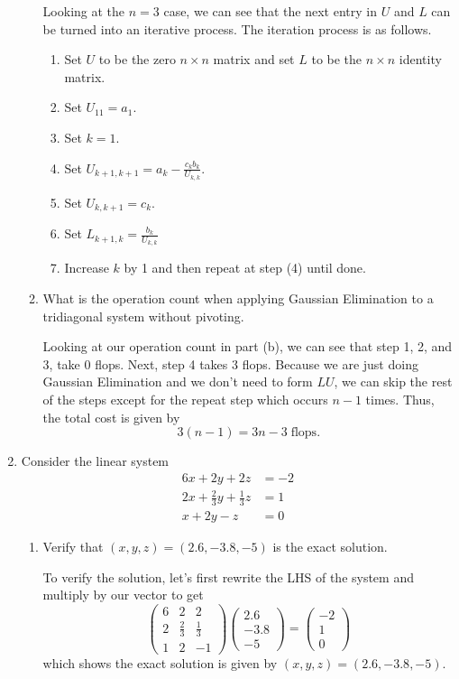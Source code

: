 \documentclass[a4paper,12pt]{article}
\newcommand{\pmat}[1]{\begin{pmatrix} #1 \end{pmatrix}}
\begin{document}
\begin{enumerate}[label = \arabic*.]
\begin{enumerate}[label = (\alph*)]
		Looking at the $ n = 3 $ case, we can see that the next entry in $ U $ and $ L $ can be turned into an iterative process. The iteration process is as follows. 
		\begin{enumerate}[label = (\arabic*)]
			\item Set $ U $ to be the zero $ n \times n $ matrix and set $ L $ to be the $ n \times n $ identity matrix.
			\item Set $ U_{11} = a_1$.
			\item Set $ k = 1 $.
			\item Set $ U_{k+1, k+1} = a_k - \frac{c_k b_k}{U_{k,k}} $.
			\item Set $ U_{k, k+1} = c_k $.
			\item Set $ L_{k+1, k} = \frac{b_k}{U_{k,k}} $
			\item Increase $ k $ by 1 and then repeat at step (4) until done.
		\end{enumerate}
	
		\item What is the operation count when applying Gaussian Elimination to a tridiagonal system without pivoting.
		
		Looking at our operation count in part (b), we can see that step 1, 2, and 3, take 0 flops. Next, step 4 takes 3 flops. Because we are just doing Gaussian Elimination and we don't need to form $ LU $, we can skip the rest of the steps except for the repeat step which occurs $ n - 1 $ times. Thus, the total cost is given by 
		\[
			3 (n - 1) = 3n - 3 \; \text{flops}.
		\]
	\end{enumerate}

	\item Consider the linear system
	\begin{align*}
		6x + 2y + 2z &= -2 \\
		2x + \frac{2}{3}y + \frac{1}{3} z &= 1 \\
		x + 2y - z &= 0
	\end{align*}

	\begin{enumerate}[label = (\alph*)]
		\item Verify that $ (x,y,z) = (2.6, -3.8, -5) $ is the exact solution.
			
			To verify the solution, let's first rewrite the LHS of the system and multiply by our vector to get
			\[
				\pmat{
					6 & 2 & 2 \\
					2 & \frac{2}{3} & \frac{1}{3} \\
					1 & 2 & -1
				}\pmat{
					2.6 \\
					-3.8 \\
					-5
				} = \pmat{
					-2 \\
					1 \\
					0
				}
			\]
			which shows the exact solution is given by $ (x,y,z) = (2.6, -3.8, -5) $.
			

\end{enumerate}
\end{enumerate}
\end{document}
